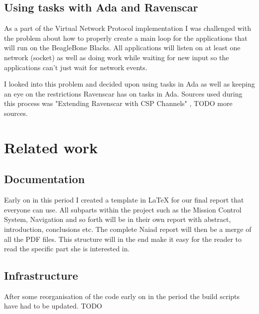 \subsection{Using tasks with Ada and Ravenscar}
As a part of the Virtual Network Protocol implementation I was challenged with
the problem about how to properly create a main loop for the applications that
will run on the BeagleBone Blacks. All applications will listen on at least one
network (socket) as well as doing work while waiting for new input so the applications
can't just wait for network events.

I looked into this problem and decided upon using tasks in Ada as well as keeping
an eye on the restrictions Ravenscar has on tasks in Ada. Sources used during
this process was "Extending Ravenscar with CSP Channels" \cite{atiya2005}, TODO
more sources.

\section{Related work}
\subsection{Documentation}
Early on in this period I created a template in LaTeX for our final report that everyone can
use. All subparts within the project such as the Mission Control System,
Navigation and so forth will be in their own report with abstract, introduction,
conclusions etc. The complete Naiad report will then be a merge of all the PDF files.
This structure will in the end make it easy for the reader to read the
specific part she is interested in.

\subsection{Infrastructure}
After some reorganisation of the code early on in the period the build scripts
have had to be updated. TODO

